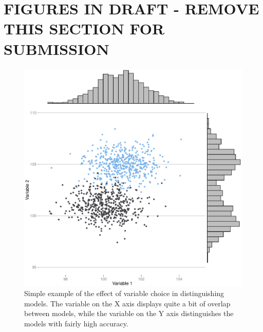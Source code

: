 \documentclass[10pt,letterpaper]{article}
\begin{document}

\clearpage
\section*{FIGURES IN DRAFT - REMOVE THIS SECTION FOR SUBMISSION}
\setcounter{figure}{0}

\begin{figure}[ht]
\centering
\includegraphics[scale=0.6]{figure/equifinality-variable-effect.pdf}
\caption{Simple example of the effect of variable choice in distinguishing models.  The variable on the X axis displays quite a bit of overlap between models, while the variable on the Y axis distinguishes the models with fairly high accuracy.}
\label{img:variables-equifinality-example}
\end{figure}
\end{document}
